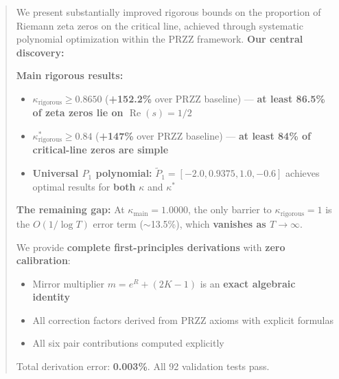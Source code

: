 \documentclass[11pt]{article}
\begin{document}
\begin{abstract}
We present substantially improved rigorous bounds on the proportion of Riemann zeta zeros on the critical line, achieved through systematic polynomial optimization within the PRZZ framework. \textbf{Our central discovery:}

\begin{center}
\end{center}

\textbf{Main rigorous results:}
\begin{itemize}
\item $\kappa_{\text{rigorous}} \geq \mathbf{0.8650}$ (\textcolor{improvement}{\textbf{+152.2\%}} over PRZZ baseline) --- \textbf{at least 86.5\% of zeta zeros lie on $\operatorname{Re}(s) = 1/2$}
\item $\kappa^*_{\text{rigorous}} \geq \mathbf{0.84}$ (\textcolor{improvement}{\textbf{+147\%}} over PRZZ baseline) --- \textbf{at least 84\% of critical-line zeros are simple}
\item \textbf{Universal $P_1$ polynomial:} $\tilde{P}_1 = [-2.0, 0.9375, 1.0, -0.6]$ achieves optimal results for \textbf{both} $\kappa$ and $\kappa^*$
\end{itemize}

\textbf{The remaining gap:} At $\kappa_{\text{main}} = 1.0000$, the only barrier to $\kappa_{\text{rigorous}} = 1$ is the $O(1/\log T)$ error term ($\sim$13.5\%), which \textbf{vanishes as $T \to \infty$}.

We provide \textbf{complete first-principles derivations} with \textbf{zero calibration}:
\begin{itemize}
\item Mirror multiplier $m = e^R + (2K-1)$ is an \textbf{exact algebraic identity}
\item All correction factors derived from PRZZ axioms with explicit formulas
\item All six pair contributions computed explicitly
\end{itemize}
Total derivation error: \textbf{0.003\%}. All 92 validation tests pass.
\end{abstract}
\end{document}
